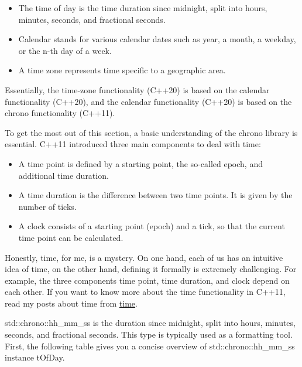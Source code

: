 \begin{itemize}
\item 
The time of day is the time duration since midnight, split into hours, minutes, seconds, and fractional seconds.

\item 
Calendar stands for various calendar dates such as year, a month, a weekday, or the n-th day of a week.

\item 
A time zone represents time specific to a geographic area.
\end{itemize}

Essentially, the time-zone functionality (C++20) is based on the calendar functionality (C++20), and the calendar functionality (C++20) is based on the chrono functionality (C++11).


\begin{tcolorbox}[colback=blue!5!white,colframe=blue!75!black,title={Lack of Compiler Support}]
	
To get the most out of this section, a basic understanding of the chrono library is essential.
C++11 introduced three main components to deal with time:

\begin{itemize}
\item 
A time point is defined by a starting point, the so-called epoch, and additional time duration.

\item 
A time duration is the difference between two time points. It is given by the number of ticks.

\item 
A clock consists of a starting point (epoch) and a tick, so that the current time point can be calculated.
\end{itemize}

Honestly, time, for me, is a mystery. On one hand, each of us has an intuitive idea of time, on the other hand, defining it formally is extremely challenging. For example, the three components time point, time duration, and clock depend on each other. If you want to know more about the time functionality in C++11, read my posts about time from \href{https://www.modernescpp.com/index.php/tag/time}{time}.
	
\end{tcolorbox}


std::chrono::hh\_mm\_ss is the duration since midnight, split into hours, minutes, seconds, and fractional seconds. This type is typically used as a formatting tool. First, the following table gives you a concise overview of std::chrono::hh\_mm\_ss instance tOfDay.

